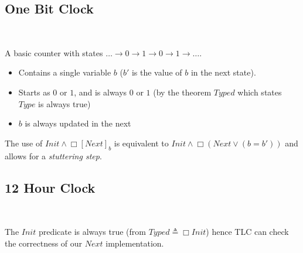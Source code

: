 \subsection{One Bit Clock}
\begin{minipage}{.48\textwidth}
    
\end{minipage}
\hfill
\begin{minipage}{.48\textwidth}
    \inputminted{text}{tla_plus/code/OneBitClock.tla}
\end{minipage}
\vspace{.3cm}
\\ A basic counter with states $\dots \to 0 \to 1 \to 0 \to 1 \to \dots$.
\begin{itemize}
    \item Contains a single variable $b$ ($b'$ is the value of $b$ in the next state).
    \item Starts as $0$ or $1$, and is always $0$ or $1$ (by the theorem $Typed$ which states $Type$ is always true)
    \item $b$ is always updated in the next 
\end{itemize}
The use of $Init \land \Box[Next]_b$ is equivalent to $Init \land \Box(Next \lor (b = b'))$ and allows for a \textit{stuttering step}.

\subsection{12 Hour Clock}
\begin{minipage}{.48\textwidth}
    
\end{minipage}
\hfill
\begin{minipage}{.48\textwidth}
    \inputminted{text}{tla_plus/code/TwelveHourClock.tla}
\end{minipage}
\vspace{.3cm}
\\ The $Init$ predicate is always true (from $Typed \triangleq \Box Init$) hence TLC can check the correctness of our $Next$ implementation.

